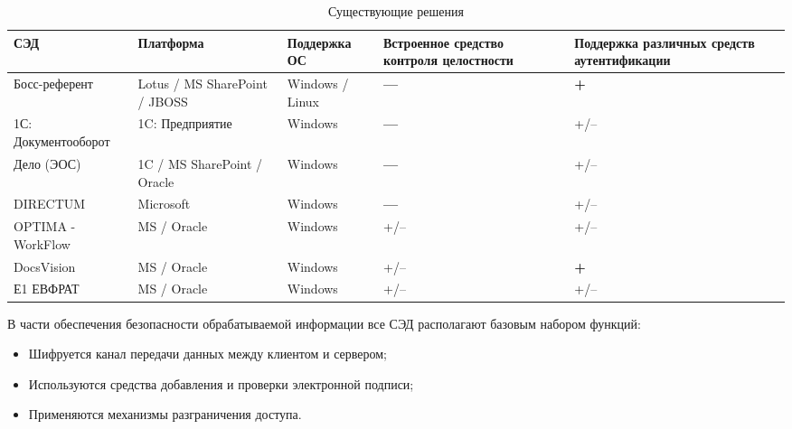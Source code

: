 \begin{table}[h!]
  \captionsetup{justification=raggedright}
  \caption{Существующие решения}\label{table:products}
 \begin{center}
  \begin{tabular}{| >{\centering}m{3cm} | >{\centering}m{3cm} | >{\centering}m{2cm} | >{\centering}m{3cm} | >{\centering}m{3cm} |}
  \hline
  \rowcolor{Gray} СЭД   & Платформа & Поддержка ОС & Встроенное средство контроля целостности & Поддержка различных средств аутентификации  \tabularnewline \hline
  Босс-референт & \color{Green} Lotus / MS SharePoint / JBOSS & \color{Green} Windows / Linux & \color{Red} \textbf{---} &  \color{Green} \textbf{+} \tabularnewline \hline

  1С: Документооборот & \color{Red} 1C: Предприятие & \color{Red} Windows & \color{Red} \textbf{---} & +/-- \tabularnewline \hline




  Дело (ЭОС) & \color{Green} 1C / MS SharePoint / Oracle & \color{Red} Windows & \color{Red} \textbf{---} & +/--  \tabularnewline \hline

  DIRECTUM & \color{Red} Microsoft & \color{Red} Windows  & \color{Red} \textbf{---} & +/--  \tabularnewline \hline

  OPTIMA - WorkFlow & \color{Green} MS / Oracle & \color{Red} Windows & +/-- & +/--   \tabularnewline \hline

  DocsVision & \color{Green} MS / Oracle & \color{Red} Windows  & +/-- & \color{Green} \textbf{+} \tabularnewline \hline

  Е1 ЕВФРАТ & \color{Green} MS / Oracle & \color{Red} Windows & +/-- & +/--  \tabularnewline \hline
  \end{tabular}
 \end{center}
\end{table}

\vspace{\baselineskip}
В части обеспечения безопасности обрабатываемой информации все СЭД располагают базовым набором функций:
\begin{itemize}
  \item Шифруется канал передачи данных между клиентом и сервером;
  \item Используются средства добавления и проверки электронной подписи;
  \item Применяются механизмы разграничения доступа.
\end{itemize}


